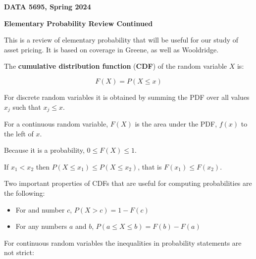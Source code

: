 \documentclass[11pt]{article}
\begin{document}
\pagestyle{empty}

\textbf{DATA 5695, Spring 2024}

\vspace{3.5mm}

\textbf{Elementary Probability Review Continued}
\vspace{3.5mm}


This is a review of elementary probability that will be useful for our study of asset pricing. It is based on
coverage in Greene, as well as Wooldridge.

\vspace{3.5mm}

The \textbf{cumulative distribution function} (\textbf{CDF}) of the random variable $X$ is:

\begin{equation*}
F(X) = P(X \leq x)
\end{equation*}

\vspace{2mm}

For discrete random variables it is obtained by summing the PDF over all values $x_{j}$ such that $x_{j} \leq x$.

\vspace{2mm}

For a continuous random variable, $F(X)$ is the area under the PDF, $f(x)$ to the left of $x$.

\vspace{2mm}

Because it is a probability, $0 \leq F(X) \leq 1$.

\vspace{2mm}

If $x_{1} < x_{2}$ then $P(X \leq x_{1}) \leq P(X \leq x_{2})$, that is $F(x_{1}) \leq F(x_{2})$.

\vspace{2mm}

Two important properties of CDFs that are useful for computing probabilities are the following:

\begin{itemize}
 \item For and number $c$, $P(X > c) = 1 - F(c)$
 \item For any numbers $a$ and $b$, $P(a \leq X \leq b) = F(b) - F(a)$
\end{itemize}

\vspace{2mm}

For continuous random variables the inequalities in probability statements are not strict:
\end{document}
